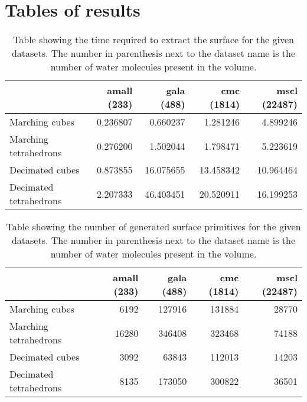 \chapter{Tables of results}
\label{cha:tables}


\begin{table}
  \begin{tabular}{ | l | r | r | r | r | }
  \hline
                         & amall (233) & gala (488) & cmc (1814) & mscl (22487)  \\ \hline
  Marching cubes         &    0.236807 &   0.660237 &   1.281246 &     4.899246  \\ \hline
  Marching tetrahedrons  &    0.276200 &   1.502044 &   1.798471 &     5.223619  \\ \hline
  \hline
  Decimated cubes        &    0.873855 &  16.075655 &  13.458342 &    10.964464  \\ \hline
  Decimated tetrahedrons &    2.207333 &  46.403451 &  20.520911 &    16.199253  \\ \hline
  \end{tabular}
  \caption{Table showing the time required to extract the surface for the given
  datasets. The number in parenthesis next to the dataset name is the number of
  water molecules present in the volume.}
  \label{tab:appendix_surface_time}
\end{table}

\begin{table}
  \begin{tabular}{ | l | r | r | r | r | }
  \hline
                         & amall (233) & gala (488) & cmc (1814) & mscl (22487)  \\ \hline
  Marching cubes         &        6192 &     127916 &     131884 &        28770  \\ \hline
  Marching tetrahedrons  &       16280 &     346408 &     323468 &        74188  \\ \hline
  \hline
  Decimated cubes        &        3092 &      63843 &     112013 &        14203  \\ \hline
  Decimated tetrahedrons &        8135 &     173050 &     300822 &        36501  \\ \hline
  \end{tabular}
  \caption{Table showing the number of generated surface primitives for the
  given datasets. The number in parenthesis next to the dataset name is the
  number of water molecules present in the volume.}
  \label{tab:appendix_surface_count}
\end{table}



